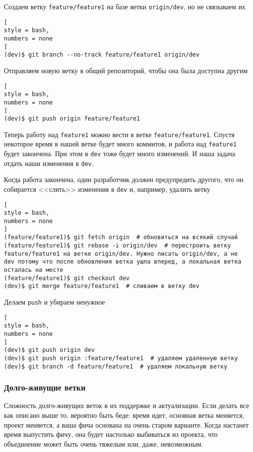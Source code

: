 \documentclass[%
	11pt,
	a4paper,
	utf8,
		]{article}
\begin{document}
Создаем ветку \texttt{feature/feature1} на базе ветки \texttt{origin/dev}, но не связываем их
\begin{lstlisting}[
style = bash,
numbers = none
]
(dev)$ git branch --no-track feature/feature1 origin/dev
\end{lstlisting}

Отправляем новую ветку в общий репозиторий, чтобы она была доступна другим
\begin{lstlisting}[
style = bash,
numbers = none
]
(dev)$ git push origin feature/feature1
\end{lstlisting}

Теперь работу над \texttt{feature1} можно вести в ветке \texttt{feature/feature1}. Спустя некоторое время в нашей ветке будет много коммитов, и работа над \texttt{feature1} будет закончена. При этом в \texttt{dev} тоже будет много изменений. И наша задача отдать наши изменения в \texttt{dev}.

Когда работа закончена, один разработчик должен предупредить другого, что он собирается <<слить>> изменения в \texttt{dev} и, например, удалить ветку
\begin{lstlisting}[
style = bash,
numbers = none
]
(feature/feature1)$ git fetch origin  # обновиться на всякий случай
(feature/feature1)$ git rebase -i origin/dev  # перестроить ветку feature/feature1 на ветке origin/dev. Нужно писать origin/dev, а не dev потому что после обновления ветка ушла вперед, а локальная ветка осталась на месте
(feature/feature1)$ git checkout dev
(dev)$ git merge feature/feature1  # сливаем в ветку dev
\end{lstlisting}

Делаем \texttt{push} и убираем ненужное
\begin{lstlisting}[
style = bash,
numbers = none
]
(dev)$ git push origin dev
(dev)$ git push origin :feature/feature1  # удаляем удаленную ветку
(dev)$ git branch -d feature/feature1  # удаляем локальную ветку
\end{lstlisting}

\subsubsection{Долго-живущие ветки}

Сложность долго-живущих веток в их поддержке и актуализации. Если делать все как описано выше то, вероятно быть беде: время идет, основная ветка меняется, проект меняется, а ваша фича основана на очень старом варианте. Когда настанет время выпустить фичу, она будет настолько выбиваться из проекта, что объединение может быть очень тяжелым или, даже, невозможным.
\end{document}
